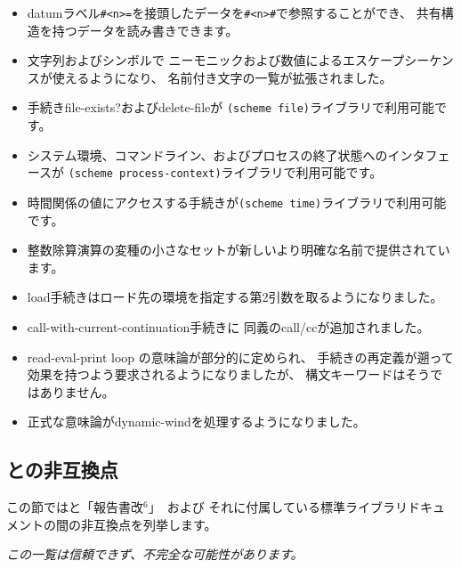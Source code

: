\begin{itemize}
\item datumラベル{\tt \#<n>=}を接頭したデータを{\tt \#<n>\#}で参照することができ、
共有構造を持つデータを読み書きできます。

\item 文字列およびシンボルで
ニーモニックおよび数値によるエスケープシーケンスが使えるようになり、
名前付き文字の一覧が拡張されました。

\item 手続き{\cf file-exists?}および{\cf delete-file}が
{\tt (scheme file)}ライブラリで利用可能です。

\item システム環境、コマンドライン、およびプロセスの終了状態へのインタフェースが
{\tt (scheme process-\+context)}ライブラリで利用可能です。

\item 時間関係の値にアクセスする手続きが{\tt (scheme time)}ライブラリで利用可能です。

\item 整数除算演算の変種の小さなセットが新しいより明確な名前で提供されています。

\item {\cf load}手続きはロード先の環境を指定する第2引数を取るようになりました。

\item {\cf call-with-current-continuation}手続きに
同義の{\cf call/cc}が追加されました。

\item read-eval-print loop の意味論が部分的に定められ、
手続きの再定義が遡って効果を持つよう要求されるようになりましたが、
構文キーワードはそうではありません。

\item 正式な意味論が{\cf dynamic-wind}を処理するようになりました。
\end{itemize}

\subsection*{\rsixrs{}との非互換点}
この節では\rsevenrs{}と「報告書改$^6$」~\cite{R6RS}および
それに付属している標準ライブラリドキュメントの間の非互換点を列挙します。

{\em この一覧は信頼できず、不完全な可能性があります。}

